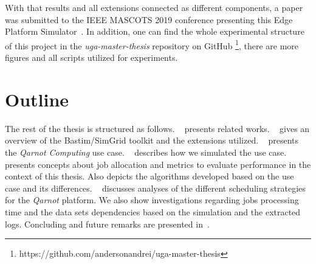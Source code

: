 With that results and all extensions connected as different components, a paper was submitted to the IEEE MASCOTS 2019 conference presenting this Edge Platform Simulator~\cite{placement-challenges}.
In addition, one can find the whole experimental structure of this project in the \textit{uga-master-thesis} repository on GitHub \footnote{https://github.com/andersonandrei/uga-master-thesis}, there are more figures and all scripts utilized for experiments.

\section{Outline}

The rest of the thesis is structured as follows.
~ presents related works.
~ gives an overview of the Bastim/SimGrid toolkit and the extensions utilized. 
~ presents the \emph{Qarnot Computing} use case.
~ describes how we simulated the use case.
~ presents concepts about job allocation and metrics to evaluate performance in the context of this thesis. Also depicts the algorithms developed based on the use case and its differences.
~ discusses analyses of the different scheduling strategies for the \emph{Qarnot} platform.
We also show investigations regarding jobs processing time and the data sets dependencies based on the simulation and the extracted logs. 
Concluding and future remarks are presented in~.